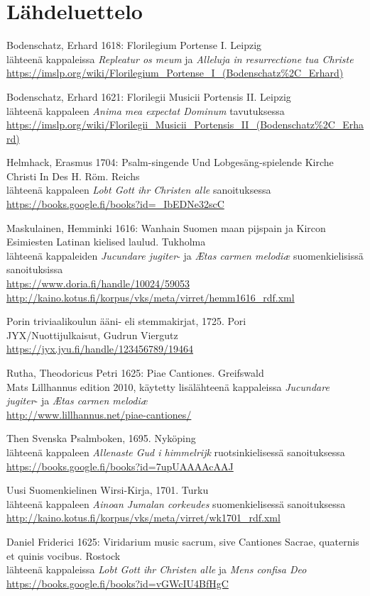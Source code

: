 \chapter*{Lähdeluettelo}

Bodenschatz, Erhard 1618: Florilegium Portense I. Leipzig \\
lähteenä kappaleissa \emph{Repleatur os meum} ja \emph{Alleluja in resurrectione tua Christe} \\
\url{https://imslp.org/wiki/Florilegium\_Portense\_I\_(Bodenschatz%2C\_Erhard)}

Bodenschatz, Erhard 1621: Florilegii Musicii Portensis II. Leipzig \\
lähteenä kappaleen \emph{Anima mea expectat Dominum} tavutuksessa \\
\url{https://imslp.org/wiki/Florilegii\_Musicii\_Portensis\_II\_(Bodenschatz%2C\_Erhard)}

Helmhack, Erasmus 1704: Psalm-singende Und Lobgesäng-spielende Kirche Christi In Des H. Röm. Reichs \\
lähteenä kappaleen \emph{Lobt Gott ihr Christen alle} sanoituksessa \\
\url{https://books.google.fi/books?id=\_IbEDNe32scC}

Maskulainen, Hemminki 1616: Wanhain Suomen maan pijspain ja Kircon Esimiesten Latinan kielised laulud. Tukholma \\
lähteenä kappaleiden \emph{Jucundare jugiter}- ja \emph{Ætas carmen melodiæ} suomenkielisissä sanoituksissa \\
\url{https://www.doria.fi/handle/10024/59053} \\
\url{http://kaino.kotus.fi/korpus/vks/meta/virret/hemm1616_rdf.xml}

Porin triviaalikoulun ääni- eli stemmakirjat, 1725. Pori \\
JYX/Nuottijulkaisut, Gudrun Viergutz \\
\url{https://jyx.jyu.fi/handle/123456789/19464}

Rutha, Theodoricus Petri 1625: Piae Cantiones. Greifswald \\
Mats Lillhannus edition 2010, käytetty lisälähteenä kappaleissa \emph{Jucundare jugiter}- ja \emph{Ætas carmen melodiæ} \\
\url{http://www.lillhannus.net/piae-cantiones/}

Then Svenska Psalmboken, 1695. Nyköping \\
lähteenä kappaleen \emph{Allenaste Gud i himmelrijk} ruotsinkielisessä sanoituksessa \\
\url{https://books.google.fi/books?id=7upUAAAAcAAJ}

Uusi Suomenkielinen Wirsi-Kirja, 1701. Turku \\
lähteenä kappaleen \emph{Ainoan Jumalan corkeudes} suomenkielisessä sanoituksessa \\
\url{http://kaino.kotus.fi/korpus/vks/meta/virret/wk1701_rdf.xml}

Daniel Friderici 1625: Viridarium music sacrum, sive Cantiones Sacrae, quaternis et quinis vocibus. Rostock \\
lähteenä kappaleissa \emph{Lobt Gott ihr Christen alle} ja \emph{Mens confisa Deo} \\
\url{https://books.google.fi/books?id=vGWcIU4BfHgC}